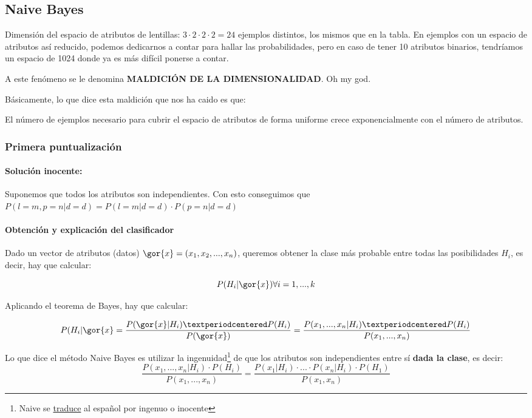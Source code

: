 \documentclass{apuntes}
\begin{document}
\subsection{Naive Bayes}

Dimensión del espacio de atributos de lentillas: $3·2·2·2 = 24$ ejemplos distintos, los mismos que en la tabla. En ejemplos con un espacio de atributos así reducido, podemos dedicarnos a contar para hallar las probabilidades, pero en caso de tener 10 atributos binarios, tendríamos un espacio de 1024 donde ya es más difícil ponerse a contar.

A este fenómeno se le denomina \textbf{MALDICIÓN DE LA DIMENSIONALIDAD}. Oh my god.

\begin{defn}
Básicamente, lo que dice esta maldición que nos ha caido es que:

El número de ejemplos necesario para cubrir el espacio de atributos de forma uniforme crece exponencialmente con el número de atributos.
\end{defn}

\subsubsection{Primera puntualización}
\paragraph{Solución inocente: } Suponemos que todos los atributos son independientes. Con esto conseguimos que $P(l=m,p=n | d=d) = P(l=m | d=d)·P(p=n | d=d)$ 

\paragraph{Obtención y explicación del clasificador}


Dado un vector de atributos (datos) $\gor{x} = (x_1,x_2,...,x_n)$, queremos obtener la clase más probable entre todas las posibilidades $H_i$, es decir, hay que calcular:

\[
P(H_i | \gor{x}) \forall i=1,...,k
\]

Aplicando el teorema de Bayes, hay que calcular:

\[
P(H_i|\gor{x} = \frac{P(\gor{x}|H_i)·P(H_i)}{P(\gor{x})} = \frac{P(x_1,...,x_n | H_i) · P(H_i)}{P(x_1,...,x_n)}
\]


Lo que dice el método Naive Bayes es utilizar la ingenuidad\footnote{Naive se \href{http://www.wordreference.com/es/translation.asp?tranword=Naive}{traduce} al español por ingenuo o inocente}  de que los atributos son independientes entre sí \textbf{dada la clase}, es decir: \[\frac{P(x_1,...,x_n | H_i) · P(H_i)}{P(x_1,...,x_n)} = \frac{P(x_1|H_i)·...·P(x_n|H_i) · P(H_1)}{P(x_1,x_n)}\]
\end{document}
